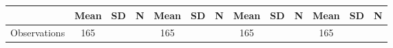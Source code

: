 {
\def\sym#1{\ifmmode^{#1}\else\(^{#1}\)\fi}
\begin{tabular}{l*{4}{ccc}}
\toprule
                    &        Mean&          SD&           N&        Mean&          SD&           N&        Mean&          SD&           N&        Mean&          SD&           N\\
\midrule
\midrule
Observations        &         165&            &            &         165&            &            &         165&            &            &         165&            &            \\
\bottomrule
\end{tabular}
}
